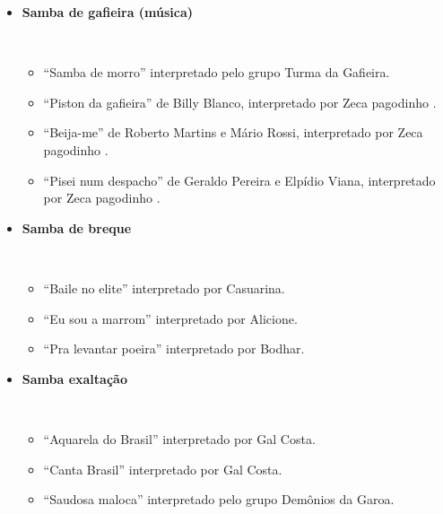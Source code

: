 \begin{itemize}
\item \textbf{Samba de gafieira (música)}
\begin{example} ~
\begin{itemize}
\item ``Samba de morro'' interpretado pelo grupo Turma da Gafieira.
\item ``Piston da gafieira'' de Billy Blanco, interpretado por Zeca pagodinho \cite{barbosa2014zeca}.
\item ``Beija-me'' de Roberto Martins e Mário Rossi, interpretado por Zeca pagodinho \cite{barbosa2014zeca}.
\item ``Pisei num despacho'' de Geraldo Pereira e Elpídio Viana, interpretado por Zeca pagodinho \cite{barbosa2014zeca}.
\end{itemize}
\end{example} 

\item \textbf{Samba de breque}
\begin{example} ~
\begin{itemize}
\item ``Baile no elite'' interpretado por Casuarina.
\item ``Eu sou a marrom'' interpretado por Alicione.
\item ``Pra levantar poeira'' interpretado por Bodhar.
\end{itemize}
\end{example} 

\item \textbf{Samba exaltação}
\begin{example} ~
\begin{itemize}
\item ``Aquarela do Brasil'' interpretado por Gal Costa.
\item ``Canta Brasil'' interpretado por Gal Costa.
\item ``Saudosa maloca'' interpretado pelo grupo Demônios da Garoa.
\end{itemize}
\end{example} 



\end{itemize}
